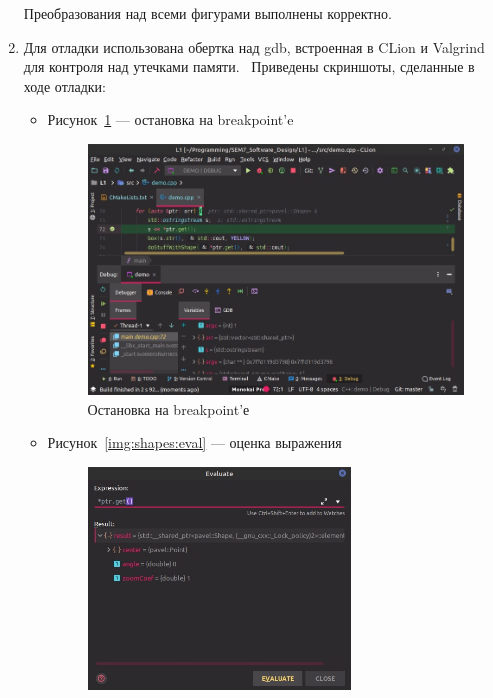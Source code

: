 \documentclass[a4paper, 14pt]{extarticle}
\begin{document}
\begin{enumerate}
    Преобразования над всеми фигурами выполнены корректно.

    \item Для отладки использована обертка над gdb, встроенная в CLion и Valgrind для контроля над утечками памяти.~\cite{clion}
    Приведены скриншоты, сделанные в ходе отладки:
    \begin{itemize}
        \item Рисунок~\ref{img:shapes:breakpoint} --- остановка на breakpoint'e
        \begin{figure}[h]
            \centering
            \includegraphics[width=\textwidth]{./img/S003.jpg}
            \caption{Остановка на breakpoint'е}%
            \label{img:shapes:breakpoint}
        \end{figure}
        \item Рисунок~\ref{img:shapes:eval} --- оценка выражения
        \begin{figure}[h]
            \centering
            \includegraphics[width=0.7\textwidth]{./img/S004.jpg}

\end{figure}
\end{itemize}
\end{enumerate}
\end{document}
